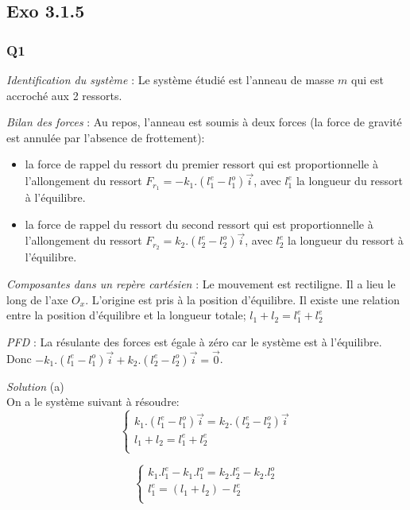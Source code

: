 \documentclass[]{book}
\theoremstyle{definition}
\begin{document}
\subsection*{Exo 3.1.5}
	
\subsubsection*{Q1}
\emph{Identification du syst\`eme} : Le syst\`eme \'etudi\'e est l'anneau de masse
$m$ qui est accroch\'e aux 2 ressorts.


\emph{Bilan des forces} : Au repos, l'anneau est soumis \`a deux forces (la force de gravit\'e est annul\'ee par l'absence de frottement): 
\begin{itemize}
\item la force de rappel du ressort du premier ressort qui est proportionnelle \`a l'allongement
du ressort $F_{r_1} = -k_1.(l^{e}_{1} - l^{o}_{1})\overrightarrow{i}$, avec $l^{e}_{1}$ la longueur du ressort \`a l'\'equilibre.
\item la force de rappel du ressort du second ressort qui est proportionnelle \`a l'allongement
du ressort $F_{r_2} = k_2.(l^{e}_{2} - l^{o}_{2})\overrightarrow{i}$, avec $l^{e}_{2}$ la longueur du ressort \`a l'\'equilibre.
\end{itemize}


\emph{Composantes dans un rep\`ere cart\'esien} : Le mouvement est rectiligne.
Il a lieu le long de l'axe $O_x$. L'origine est pris \`a la position d'\'equilibre. Il existe une relation entre la position d'\'equilibre et la longueur totale; $l_{1} + l_{2} = l^{e}_{1} + l^{e}_{2}$


\emph{PFD} : La r\'esulante des forces est \'egale \`a z\'ero car le syst\`eme est \`a l'\'equilibre. Donc 
$-k_1.(l^{e}_{1}- l^{o}_{1})\overrightarrow{i} + k_2.(l^{e}_{2}- l^{o}_{2})\overrightarrow{i}=\overrightarrow{0}$. 


\emph{Solution}
(a) \\
On a le syst\`eme suivant \`a r\'esoudre:
$$
\left\{
\begin{array}{l}
 k_1.(l^{e}_{1}- l^{o}_{1})\overrightarrow{i} = k_2.(l^{e}_{2}- l^{o}_{2})\overrightarrow{i} \\
 l_{1} + l_{2} = l^{e}_{1} + l^{e}_{2}\\
\end{array}
\right. 
$$

$$
\left\{
\begin{array}{l}
 k_1.l^{e}_{1} - k_1.l^{o}_{1} = k_2.l^{e}_{2} - k_2.l^{o}_{2} \\
 l^{e}_{1}  = (l_{1} + l_{2}) - l^{e}_{2}\\
\end{array}
\right. 
$$
\end{document}
